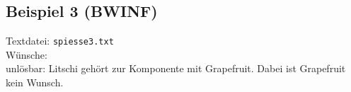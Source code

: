 \subsection{Beispiel 3 (BWINF)}\label{example:3}
Textdatei: \texttt{spiesse3.txt}\\

\noindent
Wünsche: \\

unlösbar: Litschi gehört zur Komponente mit Grapefruit. Dabei ist Grapefruit kein Wunsch.
